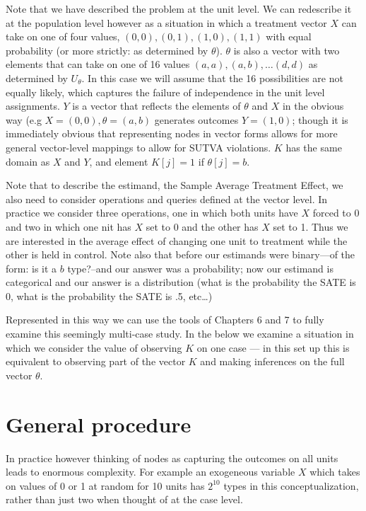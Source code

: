 \documentclass[12pt,]{book}
\begin{document}
Note that we have described the problem at the unit level. We can redescribe it at the population level however as a situation in which a treatment vector \(X\) can take on one of four values, \((0,0), (0,1), (1,0), (1,1)\) with equal probability (or more strictly: as determined by \(\theta\)). \(\theta\) is also a vector with two elements that can take on one of 16 values \((a,a), (a,b),\dots (d,d)\) as determined by \(U_\theta\). In this case we will assume that the 16 possibilities are not equally likely, which captures the failure of independence in the unit level assignments. \(Y\) is a vector that reflects the elements of \(\theta\) and \(X\) in the obvious way (e.g \(X=(0,0), \theta=(a,b)\) generates outcomes \(Y=(1,0)\); though it is immediately obvious that representing nodes in vector forms allows for more general vector-level mappings to allow for SUTVA violations. \(K\) has the same domain as \(X\) and \(Y\), and element \(K[j]=1\) if \(\theta[j]=b\).

Note that to describe the estimand, the Sample Average Treatment Effect, we also need to consider operations and queries defined at the vector level. In practice we consider three operations, one in which both units have \(X\) forced to 0 and two in which one nit has \(X\) set to 0 and the other has \(X\) set to 1. Thus we are interested in the average effect of changing one unit to treatment while the other is held in control. Note also that before our estimands were binary---of the form: is it a \(b\) type?--and our answer was a probability; now our estimand is categorical and our answer is a distribution (what is the probability the SATE is 0, what is the probability the SATE is .5, etc\ldots{})

Represented in this way we can use the tools of Chapters 6 and 7 to fully examine this seemingly multi-case study. In the below we examine a situation in which we consider the value of observing \(K\) on one case --- in this set up this is equivalent to observing part of the vector \(K\) and making inferences on the full vector \(\theta\).

\hypertarget{general-procedure}{%
\section{General procedure}\label{general-procedure}}

In practice however thinking of nodes as capturing the outcomes on all units leads to enormous complexity. For example an exogeneous variable \(X\) which takes on values of 0 or 1 at random for 10 units has \(2^10\) types in this conceptualization, rather than just two when thought of at the case level.
\end{document}
